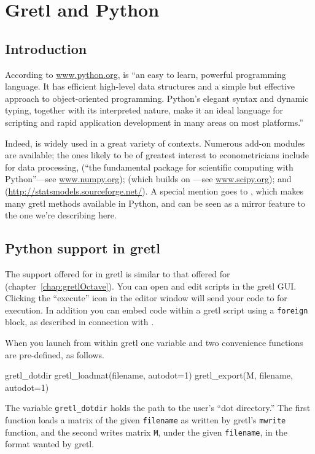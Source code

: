 \chapter{Gretl and Python}
\label{chap:gretlPython}

\section{Introduction}
\label{Python-intro}

According to \url{www.python.org},  is ``an easy to learn,
powerful programming language. It has efficient high-level data
structures and a simple but effective approach to object-oriented
programming. Python's elegant syntax and dynamic typing, together with
its interpreted nature, make it an ideal language for scripting and
rapid application development in many areas on most platforms.''

Indeed,  is widely used in a great variety of
contexts. Numerous add-on modules are available; the ones likely to be
of greatest interest to econometricians include  for data
processing,  (``the fundamental package for scientific
computing with Python''---see \url{www.numpy.org});  (which
builds on ---see \url{www.scipy.org}); and
 (\url{http://statsmodels.sourceforge.net/}). A
special mention goes to , which makes many gretl methods
available in Python, and can be seen as a mirror feature to the one
we're describing here.

\section{Python support in gretl}
\label{sec:Python-support}

The support offered for  in gretl is similar to that
offered for  (chapter~\ref{chap:gretlOctave}). You can
open and edit  scripts in the gretl GUI.  Clicking
the ``execute'' icon in the editor window will send your code to
 for execution. In addition you can embed 
code within a gretl script using a \texttt{foreign} block, as
described in connection with .

When you launch  from within gretl one variable and
two convenience functions are pre-defined, as follows.
\begin{code}
gretl_dotdir
gretl_loadmat(filename, autodot=1)
gretl_export(M, filename, autodot=1)
\end{code}
The variable \verb|gretl_dotdir| holds the path to the user's ``dot
directory.''  The first function loads a matrix of the given
\texttt{filename} as written by gretl's \texttt{mwrite}
function, and the second writes matrix \texttt{M}, under the given
\texttt{filename}, in the format wanted by gretl.

